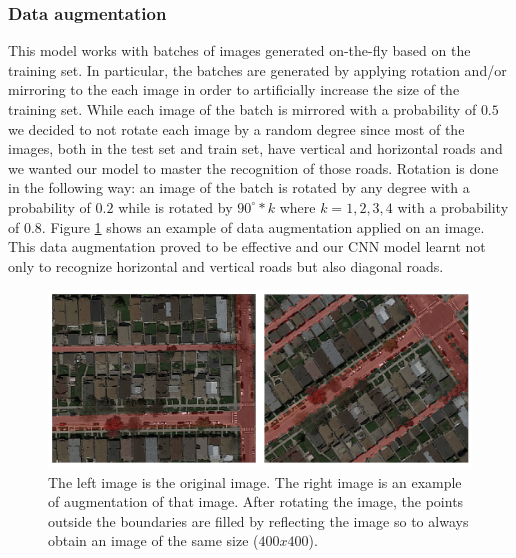 \documentclass[10pt,conference,compsocconf]{IEEEtran}
\begin{document}
\subsubsection*{Data augmentation}
 This model works with batches of images generated on-the-fly based on the training set. In particular, the batches are generated by applying rotation and/or mirroring to the each image in order to artificially increase the size of the training set. While each image of the batch is mirrored with a probability of $0.5$ we decided to not rotate each image by a random degree since most of the images, both in the test set and train set, have vertical and horizontal roads and we wanted our model to master the recognition of those roads. Rotation is done in the following way: an image of the batch is rotated by any degree with a probability of $0.2$ while is rotated by $90^\circ*k$ where $k=1,2,3,4$ with a probability of $0.8$. Figure \ref{fig:data-augmentation} shows an example of data augmentation applied on an image. This data augmentation proved to be effective and our CNN model learnt not only to recognize horizontal and vertical roads but also diagonal roads.
\begin{figure}[tbp]
	\centering
	\includegraphics[width=0.8\columnwidth]{img/data_augmentation2.png}
	\caption{The left image is the original image. The right image is an example of augmentation of that image. After rotating the image, the points outside the boundaries are filled by reflecting the image so to always obtain an image of the same size ($400x400$).}
	\vspace{-3mm}
	\label{fig:data-augmentation}
\end{figure}
\end{document}
